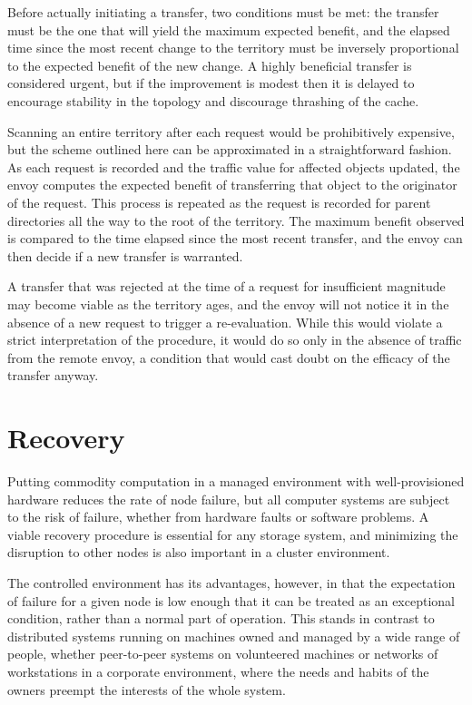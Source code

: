 Before actually initiating a transfer, two conditions must be met: the transfer must be the one that will yield the maximum expected benefit, and the elapsed time since the most recent change to the territory must be inversely proportional to the expected benefit of the new change. A highly beneficial transfer is considered urgent, but if the improvement is modest then it is delayed to encourage stability in the topology and discourage thrashing of the cache.

Scanning an entire territory after each request would be prohibitively expensive, but the scheme outlined here can be approximated in a straightforward fashion. As each request is recorded and the traffic value for affected objects updated, the envoy computes the expected benefit of transferring that object to the originator of the request. This process is repeated as the request is recorded for parent directories all the way to the root of the territory. The maximum benefit observed is compared to the time elapsed since the most recent transfer, and the envoy can then decide if a new transfer is warranted.

A transfer that was rejected at the time of a request for insufficient magnitude may become viable as the territory ages, and the envoy will not notice it in the absence of a new request to trigger a re-evaluation. While this would violate a strict interpretation of the procedure, it would do so only in the absence of traffic from the remote envoy, a condition that would cast doubt on the efficacy of the transfer anyway.

\section{Recovery}\label{sec:envoy-recovery}

Putting commodity computation in a managed environment with well-provisioned hardware reduces the rate of node failure, but all computer systems are subject to the risk of failure, whether from hardware faults or software problems. A viable recovery procedure is essential for any storage system, and minimizing the disruption to other nodes is also important in a cluster environment.

The controlled environment has its advantages, however, in that the expectation of failure for a given node is low enough that it can be treated as an exceptional condition, rather than a normal part of operation. This stands in contrast to distributed systems running on machines owned and managed by a wide range of people, whether peer-to-peer systems on volunteered machines or networks of workstations in a corporate environment, where the needs and habits of the owners preempt the interests of the whole system.

